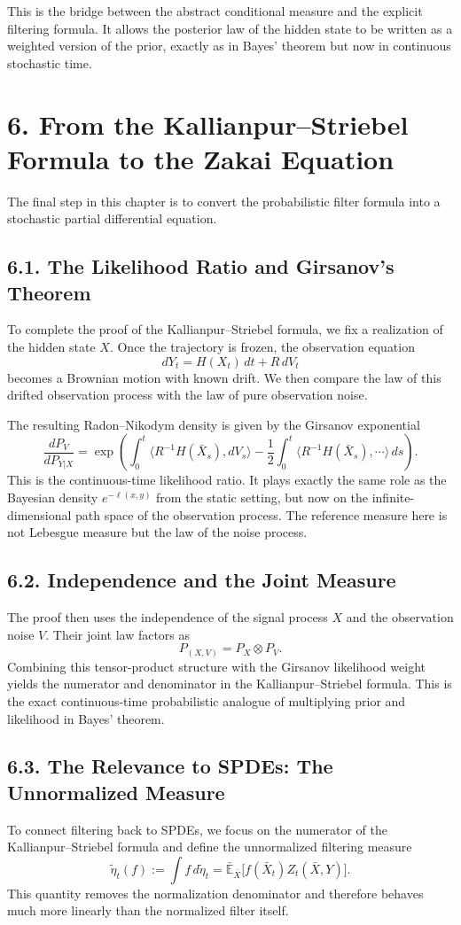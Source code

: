\documentclass[11pt]{article}
\theoremstyle{definition}
\theoremstyle{remark}
\begin{document}
This is the bridge between the abstract conditional measure and the explicit filtering formula. It allows the posterior law of the hidden state to be written as a weighted version of the prior, exactly as in Bayes' theorem but now in continuous stochastic time.

\section*{6. From the Kallianpur--Striebel Formula to the Zakai Equation}
The final step in this chapter is to convert the probabilistic filter formula into a stochastic partial differential equation.

\subsection*{6.1. The Likelihood Ratio and Girsanov's Theorem}
To complete the proof of the Kallianpur--Striebel formula, we fix a realization of the hidden state \(X\). Once the trajectory is frozen, the observation equation
\[
dY_t=H(X_t)\,dt+R\,dV_t
\]
becomes a Brownian motion with known drift. We then compare the law of this drifted observation process with the law of pure observation noise.

The resulting Radon--Nikodym density is given by the Girsanov exponential
\[
\frac{dP_V}{dP_{Y|X}}
=
\exp\left(
\int_0^t \langle R^{-1}H(\bar X_s),dV_s\rangle
-\frac12
\int_0^t \langle R^{-1}H(\bar X_s),\cdots\rangle\,ds
\right).
\]
This is the continuous-time likelihood ratio. It plays exactly the same role as the Bayesian density \(e^{-\ell(x,y)}\) from the static setting, but now on the infinite-dimensional path space of the observation process. The reference measure here is not Lebesgue measure but the law of the noise process.

\subsection*{6.2. Independence and the Joint Measure}
The proof then uses the independence of the signal process \(X\) and the observation noise \(V\). Their joint law factors as
\[
P_{(X,V)}=P_X\otimes P_V.
\]
Combining this tensor-product structure with the Girsanov likelihood weight yields the numerator and denominator in the Kallianpur--Striebel formula. This is the exact continuous-time probabilistic analogue of multiplying prior and likelihood in Bayes' theorem.

\subsection*{6.3. The Relevance to SPDEs: The Unnormalized Measure}
To connect filtering back to SPDEs, we focus on the numerator of the Kallianpur--Striebel formula and define the unnormalized filtering measure
\[
\widetilde\eta_t(f)
:=
\int f\,d\widetilde\eta_t
=
\bar{\mathbb E}_{\bar X}\bigl[f(\bar X_t)Z_t(\bar X,Y)\bigr].
\]
This quantity removes the normalization denominator and therefore behaves much more linearly than the normalized filter itself.
\end{document}
